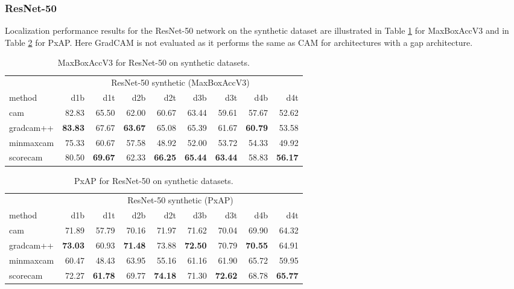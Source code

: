 \subsubsection{ResNet-50}
Localization performance results for the ResNet-50 network on the synthetic dataset are illustrated in Table \ref{tab:maxboxaccv3_resnet50_synthetic} for MaxBoxAccV3 and in Table \ref{tab:pxap_resnet50_synthetic} for PxAP. Here GradCAM is not evaluated as it performs the same as CAM for architectures with a \acrshort{gap} architecture.

\begin{table}[ht]
\centering
\begin{tabular}{lrrrrrrrr}
\toprule
 & \multicolumn{8}{c}{ResNet-50 synthetic (MaxBoxAccV3)} \\
method & d1b & d1t & d2b & d2t & d3b & d3t & d4b & d4t \\
\cmidrule(lr){1-1} \cmidrule(lr){2-9} 
cam & 82.83 & 65.50 & 62.00 & 60.67 & 63.44 & 59.61 & 57.67 & 52.62 \\
gradcam++ & \bfseries 83.83 & 67.67 & \bfseries 63.67 & 65.08 & 65.39 & 61.67 & \bfseries 60.79 & 53.58 \\
minmaxcam & 75.33 & 60.67 & 57.58 & 48.92 & 52.00 & 53.72 & 54.33 & 49.92 \\
scorecam & 80.50 & \bfseries 69.67 & 62.33 & \bfseries 66.25 & \bfseries 65.44 & \bfseries 63.44 & 58.83 & \bfseries 56.17 \\
\bottomrule
\end{tabular}
\caption[MaxBoxAccV3 for ResNet-50 on synthetic datasets]{MaxBoxAccV3 for ResNet-50 on synthetic datasets.}
\label{tab:maxboxaccv3_resnet50_synthetic}
\end{table}

\begin{table}[ht]
\centering
\begin{tabular}{lrrrrrrrr}
\toprule
 & \multicolumn{8}{c}{ResNet-50 synthetic (PxAP)} \\
method & d1b & d1t & d2b & d2t & d3b & d3t & d4b & d4t \\
\cmidrule(lr){1-1} \cmidrule(lr){2-9} 
cam & 71.89 & 57.79 & 70.16 & 71.97 & 71.62 & 70.04 & 69.90 & 64.32 \\
gradcam++ & \bfseries 73.03 & 60.93 & \bfseries 71.48 & 73.88 & \bfseries 72.50 & 70.79 & \bfseries 70.55 & 64.91 \\
minmaxcam & 60.47 & 48.43 & 63.95 & 55.16 & 61.16 & 61.90 & 65.72 & 59.95 \\
scorecam & 72.27 & \bfseries 61.78 & 69.77 & \bfseries 74.18 & 71.30 & \bfseries 72.62 & 68.78 & \bfseries 65.77 \\
\bottomrule
\end{tabular}
\caption[PxAP for ResNet-50 on synthetic datasets]{PxAP for ResNet-50 on synthetic datasets.}
\label{tab:pxap_resnet50_synthetic}
\end{table}

